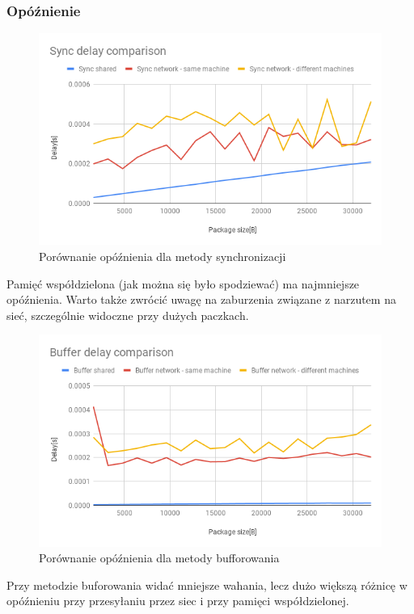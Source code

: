 \documentclass[11pt]{article}
\begin{document}
    \subsubsection{Opóźnienie}

    \begin{figure}[H]
        \includegraphics[width=1\textwidth,frame]{charts/Sync delay comparison.png}
        \caption{Porównanie opóźnienia dla metody synchronizacji}
        \label{fig:sync-delay-comparison}
    \end{figure}

    Pamięć współdzielona (jak można się było spodziewać) ma najmniejsze opóźnienia.
    Warto także zwrócić uwagę na zaburzenia związane z narzutem na sieć, szczególnie widoczne przy dużych paczkach.

    \begin{figure}[H]
        \includegraphics[width=1\textwidth,frame]{charts/Buffer delay comparison.png}
        \caption{Porównanie opóźnienia dla metody bufforowania}
        \label{fig:buffer-delay-comparison}
    \end{figure}

    Przy metodzie buforowania widać mniejsze wahania, lecz dużo większą różnicę w opóźnieniu przy przesyłaniu przez siec
    i przy pamięci współdzielonej.
\end{document}
